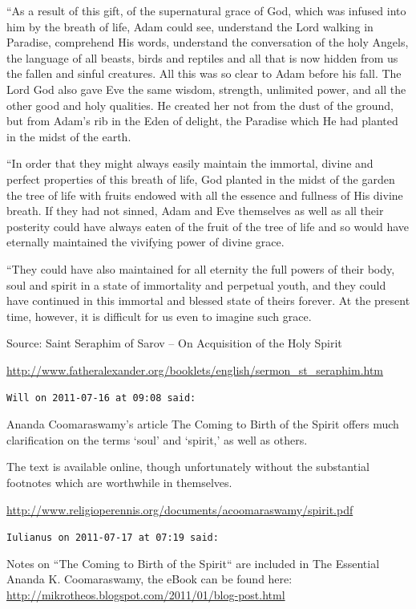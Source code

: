 \begin{footnotesize}
\begin{sffamily}
“As a result of this gift, of the supernatural grace of God, which was infused into him by the breath of life, Adam could see, understand the Lord walking in Paradise, comprehend His words, understand the conversation of the holy Angels, the language of all beasts, birds and reptiles and all that is now hidden from us the fallen and sinful creatures. All this was so clear to Adam before his fall. The Lord God also gave Eve the same wisdom, strength, unlimited power, and all the other good and holy qualities. He created her not from the dust of the ground, but from Adam's rib in the Eden of delight, the Paradise which He had planted in the midst of the earth.

“In order that they might always easily maintain the immortal, divine and perfect properties of this breath of life, God planted in the midst of the garden the tree of life with fruits endowed with all the essence and fullness of His divine breath. If they had not sinned, Adam and Eve themselves as well as all their posterity could have always eaten of the fruit of the tree of life and so would have eternally maintained the vivifying power of divine grace.

“They could have also maintained for all eternity the full powers of their body, soul and spirit in a state of immortality and perpetual youth, and they could have continued in this immortal and blessed state of theirs forever. At the present time, however, it is difficult for us even to imagine such grace.

Source: Saint Seraphim of Sarov – On Acquisition of the Holy Spirit

\url{http://www.fatheralexander.org/booklets/english/sermon\_st\_seraphim.htm}


\hfill

\texttt{Will on 2011-07-16 at 09:08 said: }

Ananda Coomaraswamy's article The Coming to Birth of the Spirit offers much clarification on the terms `soul' and `spirit,' as well as others.

The text is available online, though unfortunately without the substantial footnotes which are worthwhile in themselves.

\url{http://www.religioperennis.org/documents/acoomaraswamy/spirit.pdf}


\bigskip

\texttt{Iulianus on 2011-07-17 at 07:19 said: }

Notes on “The Coming to Birth of the Spirit“ are included in The Essential Ananda K. Coomaraswamy, the eBook can be found here: \url{http://mikrotheos.blogspot.com/2011/01/blog-post.html}


\end{sffamily}
\end{footnotesize}
